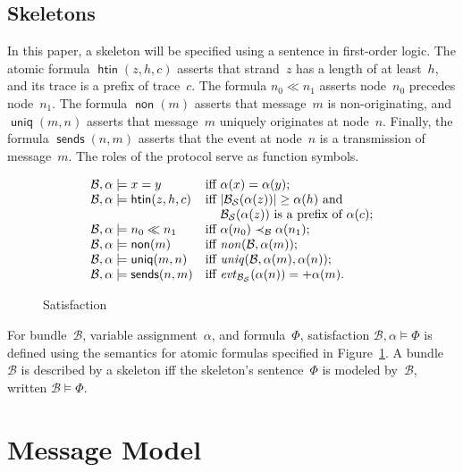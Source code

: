 \documentclass[12pt]{article}
\newcommand{\cn}[1]{\ensuremath{\operatorname{\mathsf{#1}}}}
\newcommand{\fn}[1]{\ensuremath{\operatorname{\mathit{#1}}}}
\newcommand{\outbnd}{\mathord +}
\newcommand{\ssp}{\ensuremath{\mathcal{S}}}
\newcommand{\bun}{\ensuremath{\mathcal{B}}}
\newcommand{\evt}{\fn{evt}}
\begin{document}
\subsection{Skeletons}\label{sec:skeletons}

In this paper, a skeleton will be specified using a sentence in
first-order logic.  The atomic formula $\cn{htin}(z,h,c)$ asserts
that strand~$z$ has a length of at least~$h$, and its trace is a
prefix of trace~$c$. The formula $n_0\ll n_1$ asserts node~$n_0$
precedes node~$n_1$.  The formula $\cn{non}(m)$ asserts that
message~$m$ is non-originating, and $\cn{uniq}(m,n)$ asserts that
message~$m$ uniquely originates at node~$n$.  Finally, the formula
$\cn{sends}(n,m)$ asserts that the event at node~$n$ is a transmission
of message~$m$.  The roles of the protocol serve as function symbols.

\begin{figure}
$$\begin{array}{l@{\quad}l}
\bun,\alpha\models x=y&\mbox{iff $\alpha(x)=\alpha(y)$;}\\
\bun,\alpha\models\cn{htin}(z,h,c)
&\mbox{iff $|\bun_\ssp(\alpha(z))|\geq \alpha(h)$ and}\\
&\mbox{\phantom{iff} $\bun_\ssp(\alpha(z))$ is a prefix of
  $\alpha(c)$;}\\
\bun,\alpha\models n_0\ll n_1
&\mbox{iff $\alpha(n_0)\prec_\bun\alpha(n_1)$;}\\
\bun,\alpha\models\cn{non}(m)
&\mbox{iff $\fn{non}(\bun,\alpha(m))$;}\\
\bun,\alpha\models\cn{uniq}(m,n)
&\mbox{iff $\fn{uniq}(\bun,\alpha(m),\alpha(n))$;}\\
\bun,\alpha\models\cn{sends}(n,m)
&\mbox{iff $\evt_{\bun_\ssp}(\alpha(n))=\outbnd\alpha(m)$.}
\end{array}$$
\caption{Satisfaction}\label{fig:satisfaction}
\end{figure}

For bundle~$\bun$, variable assignment~$\alpha$, and
formula~$\Phi$, satisfaction $\bun,\alpha\models\Phi$ is defined
using the semantics for atomic formulas specified in
Figure~\ref{fig:satisfaction}.  A bundle~$\bun$ is described by a
skeleton iff the skeleton's sentence~$\Phi$ is modeled by~$\bun$,
written $\bun\models\Phi$.

\section{Message Model}\label{sec:message model}
\end{document}
